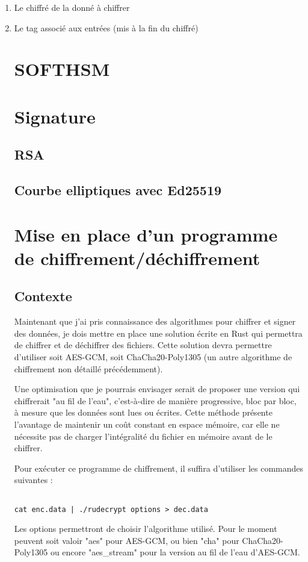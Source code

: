\documentclass[a4paper, 12pt]{article}
\begin{document}
\begin{enumerate}
	\item Le chiffré de la donné à chiffrer
	\item Le tag associé aux entrées (mis à la fin du chiffré)
\section{SOFTHSM}
\section{Signature}
\subsection{RSA}
\subsection{Courbe elliptiques avec Ed25519}

\section{Mise en place d'un programme de chiffrement/déchiffrement}
\subsection{Contexte}
Maintenant que j'ai pris connaissance des algorithmes pour chiffrer et signer des données, je dois mettre en place une solution écrite en Rust qui permettra de chiffrer et de déchiffrer des fichiers. Cette solution devra permettre d'utiliser soit AES-GCM, soit ChaCha20-Poly1305 (un autre algorithme de chiffrement non détaillé précédemment).

Une optimisation que je pourrais envisager serait de proposer une version qui chiffrerait "au fil de l'eau", c'est-à-dire de manière progressive, bloc par bloc, à mesure que les données sont lues ou écrites. Cette méthode présente l'avantage de maintenir un coût constant en espace mémoire, car elle ne nécessite pas de charger l'intégralité du fichier en mémoire avant de le chiffrer.

Pour exécuter ce programme de chiffrement, il suffira d'utiliser les commandes suivantes :
\begin{verbatim}

cat enc.data | ./rudecrypt options > dec.data
\end{verbatim}
Les options permettront de choisir l'algorithme utilisé. Pour le moment peuvent soit valoir "aes" pour AES-GCM, ou bien "cha" pour ChaCha20-Poly1305 ou encore "aes\_stream" pour la version au fil de l'eau d'AES-GCM.\\



\end{enumerate}
\end{document}
